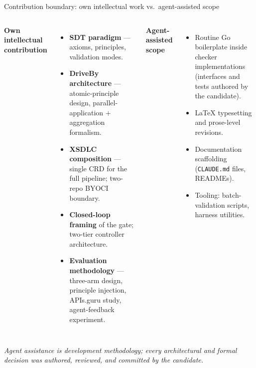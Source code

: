 \documentclass[11pt,aspectratio=169]{beamer}
\begin{document}
\begin{frame}{Contribution boundary: own intellectual work vs.\ agent-assisted scope}

\footnotesize

\begin{columns}[T,onlytextwidth]

\textbf{\textcolor{sdtblue}{Own intellectual contribution}}\\[0.15em]
\begin{itemize}\setlength\itemsep{0.15em}
\item \textbf{SDT paradigm} --- axioms, principles, validation modes.
\item \textbf{DriveBy architecture} --- atomic-principle design,
  parallel-application $+$ aggregation formalism.
\item \textbf{XSDLC composition} --- single CRD for the full pipeline;
  two-repo BYOCI boundary.
\item \textbf{Closed-loop framing} of the gate; two-tier controller architecture.
\item \textbf{Evaluation methodology} --- three-arm design, principle
  injection, APIs.guru study, agent-feedback experiment.
\end{itemize}

\textbf{\textcolor{sdtblue}{Agent-assisted scope}}\\[0.15em]
\begin{itemize}\setlength\itemsep{0.15em}
\item Routine Go boilerplate inside checker implementations
  (interfaces and tests authored by the candidate).
\item LaTeX typesetting and prose-level revisions.
\item Documentation scaffolding (\texttt{CLAUDE.md} files, READMEs).
\item Tooling: batch-validation scripts, harness utilities.
\end{itemize}

\end{columns}

\vspace{0.3em}
\begin{center}
\scriptsize\itshape
Agent assistance is \emph{development methodology}; every architectural and formal
decision was authored, reviewed, and committed by the candidate.
\end{center}

\end{frame}
\end{document}
